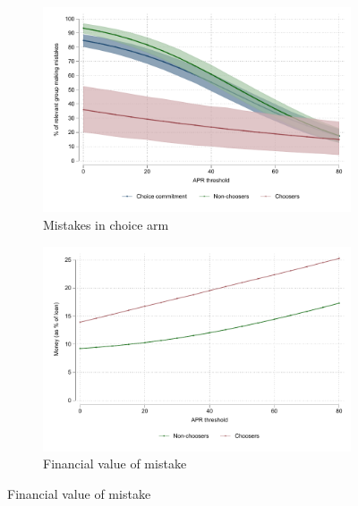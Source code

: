 \documentclass[oneside,11pt]{article}
\begin{document}
\begin{figure}[H]
    \caption{Choice of contracts and treatment effects (ToT \& TuT)}
    \label{choose_wrong}
    \begin{center}
        \begin{subfigure}{0.45\textwidth}
        \caption{Mistakes in choice arm}
        \centering
        \includegraphics[width=\textwidth]{Figuras/line_cw_apr_tot_tut.pdf}
        
    \end{subfigure}
        \begin{subfigure}{0.45\textwidth}
        \caption{Financial value of mistake}
        \centering
        \includegraphics[width=\textwidth]{Figuras/money_cw_apr_tot_tut.pdf}

    \bigskip
        

\end{subfigure}
\end{center}
\end{figure}
\end{document}
